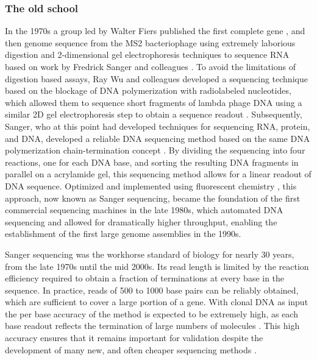 \subsubsection{The old school}

In the 1970s a group led by Walter Fiers published the first complete gene \cite{jou1972nucleotide}, and then genome sequence \cite{fiers1976complete} from the MS2 bacteriophage using extremely laborious digestion and 2-dimensional gel electrophoresis techniques to sequence RNA based on work by Fredrick Sanger and colleagues \cite{sanger1965two, adams1969nucleotide}.
To avoid the limitations of digestion based assays, Ray Wu and colleagues developed a sequencing technique based on the blockage of DNA polymerization with radiolabeled nucleotides, which allowed them to sequence short fragments of lambda phage DNA using a similar 2D gel electrophoresis step to obtain a sequence readout \cite{wu1972nucleotide, padmanabhan1974chemical}.
Subsequently, Sanger, who at this point had developed techniques for sequencing RNA, protein, and DNA, developed a reliable DNA sequencing method based on the same DNA polymerization chain-termination concept \cite{sanger1977dna}.
By dividing the sequencing into four reactions, one for each DNA base, and sorting the resulting DNA fragments in parallel on a acrylamide gel, this sequencing method allows for a linear readout of DNA sequence.
Optimized and implemented using fluorescent chemistry \cite{strauss1986specific}, this approach, now known as Sanger sequencing, became the foundation of the first commercial sequencing machines in the late 1980s, which automated DNA sequencing and allowed for dramatically higher throughput, enabling the establishment of the first large genome assemblies in the 1990s.

Sanger sequencing was the workhorse standard of biology for nearly 30 years, from the late 1970s until the mid 2000s.
Its read length is limited by the reaction efficiency required to obtain a fraction of terminations at every base in the sequence.
In practice, reads of 500 to 1000 base pairs can be reliably obtained, which are sufficient to cover a large portion of a gene.
With clonal DNA as input the per base accuracy of the method is expected to be extremely high, as each base readout reflects the termination of large numbers of molecules \cite{castiblanco2013primer}.
This high accuracy ensures that it remains important for validation despite the development of many new, and often cheaper sequencing methods \cite{sikkema2013targeted}.


